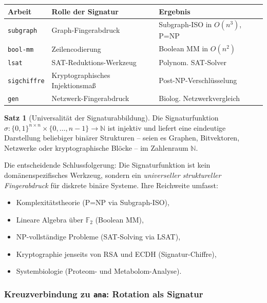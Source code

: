 ﻿\documentclass[a4paper,12pt]{scrreprt}
\theoremstyle{definition}
\newtheorem{satz}{Satz}[section]
\begin{document}
\begin{center}
\begin{tabular}{lll}
\toprule
\textbf{Arbeit} & \textbf{Rolle der Signatur} & \textbf{Ergebnis} \\
\midrule
\texttt{subgraph} & Graph-Fingerabdruck & Subgraph-ISO in $O(n^3)$, P=NP \\
\texttt{bool-mm}  & Zeilencodierung     & Boolean MM in $O(n^2)$ \\
\texttt{lsat}     & SAT-Reduktions-Werkzeug & Polynom. SAT-Solver \\
\texttt{sigchiffre} & Kryptographisches Injektionsmaß & Post-NP-Verschlüsselung \\
\texttt{gen}      & Netzwerk-Fingerabdruck & Biolog. Netzwerkvergleich \\
\bottomrule
\end{tabular}
\end{center}

\begin{satz}[Universalität der Signaturabbildung]
  Die Signaturfunktion $\sigma: \{0,1\}^{n \times n} \times \{0,\ldots,n-1\}
  \to \mathbb{N}$ ist injektiv und liefert eine eindeutige Darstellung beliebiger
  binärer Strukturen -- seien es Graphen, Bitvektoren, Netzwerke oder
  kryptographische Blöcke -- im Zahlenraum $\mathbb{N}$.
\end{satz}

Die entscheidende Schlussfolgerung: Die Signaturfunktion ist kein
domänenspezifisches Werkzeug, sondern ein \emph{universeller struktureller
Fingerabdruck} für diskrete binäre Systeme. Ihre Reichweite umfasst:

\begin{itemize}
  \item Komplexitätstheorie (P=NP via Subgraph-ISO),
  \item Lineare Algebra über $\mathbb{F}_2$ (Boolean MM),
  \item NP-vollständige Probleme (SAT-Solving via LSAT),
  \item Kryptographie jenseits von RSA und ECDH (Signatur-Chiffre),
  \item Systembiologie (Proteom- und Metabolom-Analyse).
\end{itemize}

\subsubsection{Kreuzverbindung zu \texttt{ana}: Rotation als Signatur}
\end{document}
